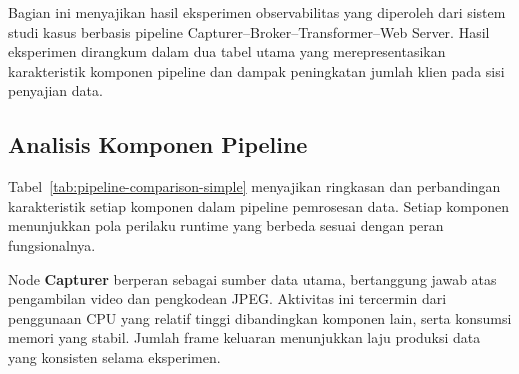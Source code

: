 Bagian ini menyajikan hasil eksperimen observabilitas yang diperoleh dari sistem studi kasus berbasis pipeline Capturer--Broker--Transformer--Web Server. Hasil eksperimen dirangkum dalam dua tabel utama yang merepresentasikan karakteristik komponen pipeline dan dampak peningkatan jumlah klien pada sisi penyajian data.

\subsection*{Analisis Komponen Pipeline}


\begin{table}[htbp]
\centering
\caption{Ringkasan Peran dan Beban Kerja Setiap Komponen Sistem}
\label{tab:pipeline-comparison-simple}
\end{table}


Tabel~\ref{tab:pipeline-comparison-simple} menyajikan ringkasan dan perbandingan karakteristik setiap komponen dalam pipeline pemrosesan data. Setiap komponen menunjukkan pola perilaku runtime yang berbeda sesuai dengan peran fungsionalnya.

Node \textbf{Capturer} berperan sebagai sumber data utama, bertanggung jawab atas pengambilan video dan pengkodean JPEG. Aktivitas ini tercermin dari penggunaan CPU yang relatif tinggi dibandingkan komponen lain, serta konsumsi memori yang stabil. Jumlah frame keluaran menunjukkan laju produksi data yang konsisten selama eksperimen.

